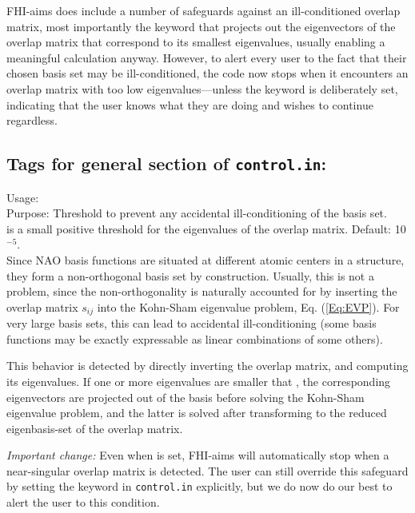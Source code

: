 FHI-aims does include a number of safeguards against an ill-conditioned
overlap matrix, most importantly the  keyword that
projects out the eigenvectors of the overlap matrix that correspond to its
smallest eigenvalues, usually enabling a meaningful calculation
anyway. However, to alert every user to the fact that their chosen basis set
may be ill-conditioned, the code now stops when it encounters an overlap
matrix with too low eigenvalues---unless the keyword
 is deliberately set, indicating that the
user knows what they are doing and wishes to continue regardless.

\newpage

\subsection*{Tags for general section of \texttt{control.in}:}

{
  \noindent
  Usage:   \\[1.0ex]
  Purpose: Threshold to prevent any accidental ill-conditioning of the
    basis set. \\[1.0ex]
   is a small positive threshold for the
  eigenvalues of the overlap matrix. Default: 10$^{-5}$. \\
}
Since NAO basis functions are situated at different atomic centers in
a structure, they form a non-orthogonal basis set by
construction. Usually, this is not a problem, since the
non-orthogonality is naturally accounted for by inserting the overlap
matrix $s_{ij}$ into the Kohn-Sham eigenvalue problem, Eq. (\ref{Eq:EVP}). For
very large basis sets, this can lead to accidental ill-conditioning
(some basis functions may be exactly expressable as linear
combinations of some others).

This behavior is detected by directly inverting the overlap matrix,
and computing its eigenvalues. If one or more eigenvalues are smaller
that , the corresponding eigenvectors are projected
out of the basis before solving the Kohn-Sham eigenvalue problem, and
the latter is solved after transforming to the reduced eigenbasis-set
of the overlap matrix.

\emph{Important change:} Even when  is set, FHI-aims
will automatically stop when a near-singular overlap matrix is detected. The
user can still override this safeguard by setting the
 keyword in \texttt{control.in} explicitly,
but we do now do our best to alert the user to this condition.


